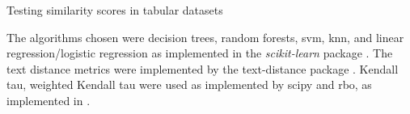 \begin{algorithm}[hbtp]
\SetAlgoLined



 \caption{Testing similarity scores in tabular datasets}
 \label{alg:simil_1}

\end{algorithm}



The algorithms chosen were decision trees, random forests, \ac{svm},  \ac{knn}, and linear regression/logistic regression as implemented in the \textit{scikit-learn} package \cite{scikit-learn}. The text distance metrics were implemented by the text-distance package \cite{orsiniumTextdistanceComputeDistance}. Kendall tau, weighted Kendall tau were used as implemented by scipy \cite{virtanenSciPyFundamentalAlgorithms2020a} and \ac{rbo}, as implemented in \cite{chenRankbiasedOverlapRBO2023}.






